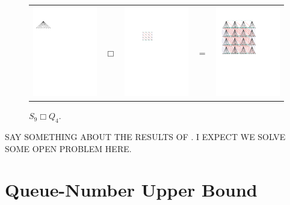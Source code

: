 \documentclass[kpfonts]{patmorin}
\begin{document}
\begin{figure}
	\begin{center}
		\begin{tabular}{m{}m{2ex}m{}m{2ex}m{}}
		\includegraphics[width=.25\textwidth]{figs/s} & $\Box$ & \includegraphics[width=.25\textwidth]{figs/q} & $=$
		& \includegraphics[width=.3\textwidth]{figs/product}
	\end{tabular}
	\end{center}
	\caption{$S_9\Box Q_4$.}
\end{figure}

SAY SOMETHING ABOUT THE RESULTS OF \citet{Pupyrev}. I EXPECT WE SOLVE SOME OPEN PROBLEM HERE.

\section{Queue-Number Upper Bound}
\end{document}
